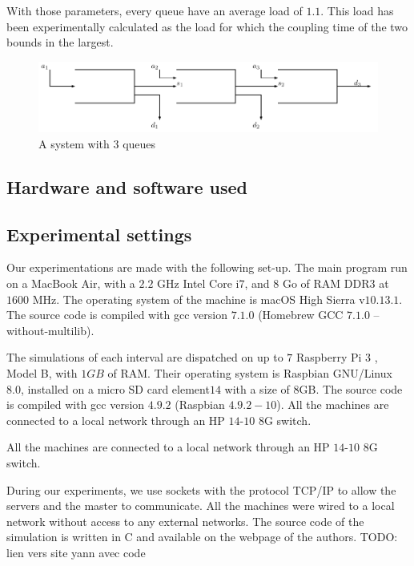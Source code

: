 \documentclass[a4paper,10pt]{article}
\newcommand{\todo}[1]{{\color{red} TODO: {#1}}}
\begin{document}
With those parameters, every queue have an average load of $1.1$. This load has been experimentally calculated as the load for which the coupling time of the two bounds in the largest.

\begin{figure}[h]
 \includegraphics[scale=0.75]{tandem.pdf}
 \caption{A system with 3 queues}
\end{figure}

\subsection{Hardware and software used}

\subsection{Experimental settings}

Our experimentations are made with the following set-up.
The main program run on a MacBook Air, with a $2.2$ GHz Intel Core i$7$, and $8$ Go of RAM DDR$3$ at $1600$ MHz. The operating system of the machine is macOS High Sierra v$10.13.1$. The source code is compiled with  gcc version $7.1.0$ (Homebrew GCC $7.1.0$ -- without-multilib).

The simulations of each interval are dispatched on up to $7$ Raspberry Pi $3$ , Model B, with $1GB$ of RAM. Their operating system is  Raspbian GNU/Linux $8.0$, installed on a micro SD card element$14$ with a size of $8$GB. The source code is compiled with gcc version $4.9.2$ (Raspbian $4.9.2-10$). All the machines are connected to a local network through an HP $14$-$10$ $8$G switch.

All the machines are connected to a local network through an HP $14$-$10$ $8$G switch. 

During our experiments, we use sockets with the protocol TCP/IP to allow the servers and the master to communicate. All the machines were wired to a local network without access to any external networks. The source code of the simulation is written in C and available on the webpage of the authors. 
\todo{lien vers site yann avec code}
\end{document}

